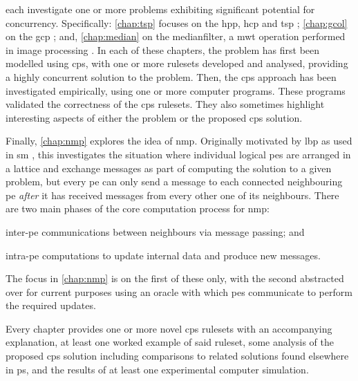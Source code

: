  each investigate one or more problems exhibiting significant potential for concurrency.  Specifically: \cref{chap:tsp} focuses on the \gls{hpp}, \gls{hcp} and \gls{tsp} \cite{Applegate2006,Cook2012}; \cref{chap:gcol} on the \gls{gcp} \cite{Lewis2016}; and, \cref{chap:median} on the \gls{medianfilter}, a \gls{mwt} operation performed in image processing \cite{Fisher2016,Gimelfarb2018}.  In each of these chapters, the problem has first been modelled using \gls{cps}, with one or more \glspl{ruleset} developed and analysed, providing a highly concurrent solution to the problem.  Then, the \gls{cps} approach has been investigated empirically, using one or more computer programs.  These programs validated the correctness of the \gls{cps} \glspl{ruleset}.  They also sometimes highlight interesting aspects of either the problem or the proposed \gls{cps} solution.

Finally, \cref{chap:nmp} explores the idea of \gls{nmp}.  %
Originally motivated by \gls{lbp} \cite{Sun2003,Felzenszwalb2006,Felzenszwalb2011} as used in \gls{sm} \cite{Sinha2020,Tippetts2016,Scharstein2002}, this  investigates the situation where individual logical \glspl{pe} are arranged in a lattice and exchange messages as part of computing the solution to a given problem, but every \gls{pe} can only send a message to each connected neighbouring \gls{pe} \emph{after} it has received messages from every other one of its neighbours.  There are two main phases of the core computation process for \gls{nmp}:
\begin{inparaenum}[a)]
\item inter-\gls{pe} communications between neighbours via message passing; and
\item intra-\gls{pe} computations to update internal data and produce new messages.
\end{inparaenum}  The focus in \cref{chap:nmp} is on the first of these only, with the second abstracted over for current purposes using an oracle with which \glspl{pe} communicate to perform the required updates.

Every chapter provides one or more novel \gls{cps} \glspl{ruleset} with an accompanying explanation, at least one worked example of said \gls{ruleset}, some analysis of the proposed \gls{cps} solution including comparisons to related solutions found elsewhere in \gls{ps}, and the results of at least one experimental computer simulation.

